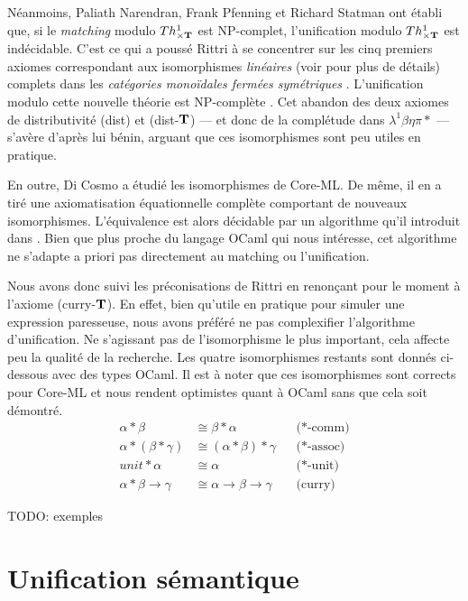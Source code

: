 \documentclass [a4paper] {report}
\theoremstyle {definition}
\begin{document}
Néanmoins, Paliath Narendran, Frank Pfenning et Richard Statman \cite {narendran_pfenning_statman} ont établi que, si le \emph {matching} modulo $Th^1 _{\times \bold T}$ est NP-complet, l'unification modulo $Th^1 _{\times \bold T}$ est indécidable. C'est ce qui a poussé Rittri \cite {rittri93} à se concentrer sur les cinq premiers axiomes correspondant aux isomorphismes \emph {linéaires} (voir \cite {rittri93} pour plus de détails) complets dans les \emph {catégories monoïdales fermées symétriques} \cite {soloviev93}. L'unification modulo cette nouvelle théorie est NP-complète \cite{narendran_pfenning_statman}. Cet abandon des deux axiomes de distributivité (dist) et (dist-$\bold T$) — et donc de la complétude dans $\lambda^1 \beta \eta \pi *$ — s'avère d'après lui bénin, arguant que ces isomorphismes sont peu utiles en pratique.

En outre, Di Cosmo \cite {dicosmo92} a étudié les isomorphismes de Core-ML. De même, il en a tiré une axiomatisation équationnelle complète comportant de nouveaux isomorphismes. L'équivalence est alors décidable par un algorithme qu'il introduit dans \cite {dicosmo95}. Bien que plus proche du langage OCaml qui nous intéresse, cet algorithme ne s'adapte a priori pas directement au matching ou l'unification.

Nous avons donc suivi les préconisations de Rittri en renonçant pour le moment à l'axiome (curry-$\bold T$). En effet, bien qu'utile en pratique pour simuler une expression paresseuse, nous avons préféré ne pas complexifier l'algorithme d'unification. Ne s'agissant pas de l'isomorphisme le plus important, cela affecte peu la qualité de la recherche. Les quatre isomorphismes restants sont donnés ci-dessous avec des types OCaml. Il est à noter que ces isomorphismes sont corrects pour Core-ML \cite {dicosmo93} et nous rendent optimistes quant à OCaml sans que cela soit démontré.
\begin {align*}
		\alpha * \beta &\cong
		\beta * \alpha &&
		\text {($*$-comm)}
	\\
		\alpha * (\beta * \gamma) &\cong
		(\alpha * \beta) * \gamma &&
		\text {($*$-assoc)}
	\\
		unit * \alpha &\cong
		\alpha &&
		\text {($*$-unit)}
	\\
		\alpha * \beta \rightarrow \gamma &\cong
		\alpha \rightarrow \beta \rightarrow \gamma &&
		\text {(curry)}
\end {align*}

TODO: exemples

\section {Unification sémantique}
\end{document}
